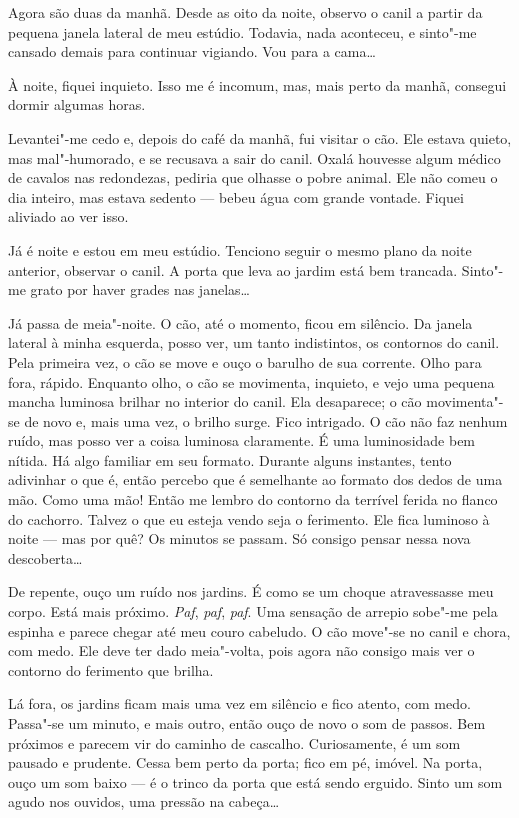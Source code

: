 Agora são duas da manhã. Desde as oito da noite, observo o canil a partir da pequena janela lateral de meu estúdio.
Todavia, nada aconteceu, e sinto"-me cansado demais para continuar vigiando. Vou para a cama\ldots{}

À noite, fiquei inquieto. Isso me é incomum, mas, mais perto da manhã, consegui dormir algumas horas.

Levantei"-me cedo e, depois do café da manhã, fui visitar o cão. Ele estava quieto, mas mal"-humorado, e se recusava a
sair do canil. Oxalá houvesse algum médico de cavalos nas redondezas, pediria que olhasse o pobre animal. Ele não comeu
o dia inteiro, mas estava sedento --- bebeu água com grande vontade. Fiquei aliviado ao ver isso.

Já é noite e estou em meu estúdio. Tenciono seguir o mesmo plano da noite anterior, observar o canil. A porta que leva
ao jardim está bem trancada. Sinto"-me grato por haver grades nas janelas\ldots{}

Já passa de meia"-noite. O cão, até o momento, ficou em silêncio. Da janela lateral à minha esquerda, posso
ver, um tanto indistintos, os contornos do canil. Pela primeira vez, o cão se move e ouço o barulho de sua corrente.
Olho para fora, rápido. Enquanto olho, o cão se movimenta, inquieto, e vejo uma pequena mancha luminosa brilhar no
interior do canil. Ela desaparece; o cão movimenta"-se de novo e, mais uma vez, o brilho surge. Fico intrigado. O cão
não faz nenhum ruído, mas posso ver a coisa luminosa claramente. É uma luminosidade bem nítida. Há algo familiar em seu
formato. Durante alguns instantes, tento adivinhar o que é, então percebo que é semelhante ao formato dos dedos de
uma mão. Como uma mão! Então me lembro do contorno da terrível ferida no flanco do cachorro. Talvez o que eu esteja
vendo seja o ferimento. Ele fica luminoso à noite --- mas por quê? Os minutos se passam. Só consigo pensar nessa nova
descoberta\ldots{}

De repente, ouço um ruído nos jardins. É como se um choque atravessasse meu corpo. Está mais próximo. \textit{Paf},
\textit{paf}, \textit{paf}. Uma sensação de arrepio sobe"-me pela espinha e parece chegar até meu couro cabeludo. O cão
move"-se no canil e chora, com medo. Ele deve ter dado meia"-volta, pois agora não consigo mais ver o contorno do
ferimento que brilha.

Lá fora, os jardins ficam mais uma vez em silêncio e fico atento, com medo. Passa"-se um minuto, e mais outro, então
ouço de novo o som de passos. Bem próximos e parecem vir do caminho de cascalho. Curiosamente, é um som pausado e
prudente. Cessa bem perto da porta; fico em pé, imóvel. Na porta, ouço um som baixo --- é o trinco da porta que está
sendo erguido. Sinto um som agudo nos ouvidos, uma pressão na cabeça\ldots{}

